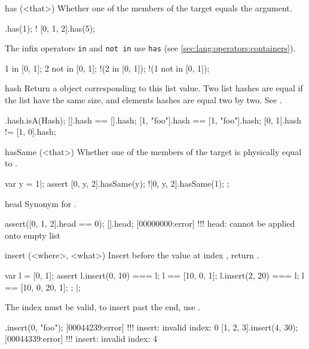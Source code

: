 \begin{urbiscriptapi}
\item[has](<that>)%
  Whether one of the members of the target equals the argument.

\begin{urbiassert}
[0, 1, 2].has(1);
! [0, 1, 2].has(5);
\end{urbiassert}

  The infix operators \lstinline|in| and \lstinline|not in| use
  \lstinline|has| (see \autoref{sec:lang:operators:containers}).

\begin{urbiassert}
  1 in     [0, 1];
  2 not in [0, 1];
!(2 in     [0, 1]);
!(1 not in [0, 1]);
\end{urbiassert}

\item[hash] Return a  object corresponding to this list
  value. Two list hashes are equal if the list have the same size, and
  elements hashes are equal two by two. See .

\begin{urbiassert}
[].hash.isA(Hash);
[].hash == [].hash;
[1, "foo"].hash == [1, "foo"].hash;
[0, 1].hash != [1, 0].hash;
\end{urbiassert}

\item[hasSame](<that>)%
  Whether one of the members of the target is physically equal to
  .
\begin{urbiscript}
var y = 1|;
assert
{
   [0, y, 2].hasSame(y);
  ![0, y, 2].hasSame(1);
};
\end{urbiscript}

\item[head]
  Synonym for .
\begin{urbiscript}
assert([0, 1, 2].head == 0);
[].head;
[00000000:error] !!! head: cannot be applied onto empty list
\end{urbiscript}

\item[insert](<where>, <what>)%
  Insert  before the value at index , return
  \this.
\begin{urbiscript}
{
  var l = [0, 1];
  assert
  {
    l.insert(0, 10) === l;
    l == [10, 0, 1];
    l.insert(2, 20) === l;
    l == [10, 0, 20, 1];
  };
}|;
\end{urbiscript}

  The index must be valid, to insert past the end, use .
\begin{urbiscript}
[].insert(0, "foo");
[00044239:error] !!! insert: invalid index: 0
[1, 2, 3].insert(4, 30);
[00044339:error] !!! insert: invalid index: 4
\end{urbiscript}



\end{urbiscriptapi}
